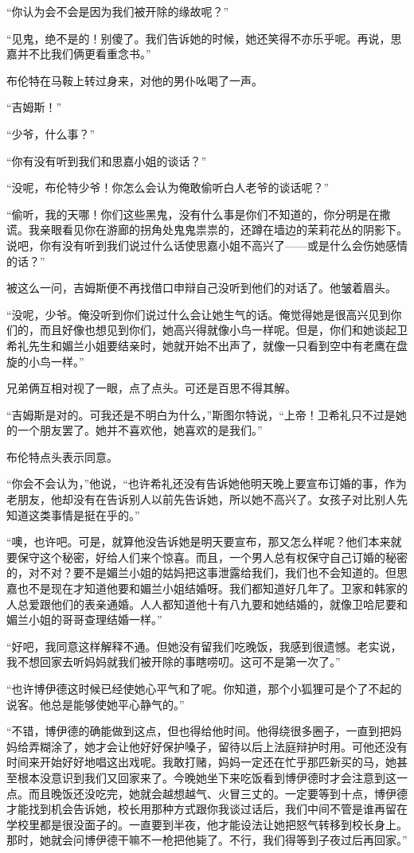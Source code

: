 \par “你认为会不会是因为我们被开除的缘故呢？”
\par “见鬼，绝不是的！别傻了。我们告诉她的时候，她还笑得不亦乐乎呢。再说，思嘉并不比我们俩更看重念书。”
\par 布伦特在马鞍上转过身来，对他的男仆吆喝了一声。
\par “吉姆斯！”
\par “少爷，什么事？”
\par “你有没有听到我们和思嘉小姐的谈话？”
\par “没呢，布伦特少爷！你怎么会认为俺敢偷听白人老爷的谈话呢？”
\par “偷听，我的天哪！你们这些黑鬼，没有什么事是你们不知道的，你分明是在撒谎。我亲眼看见你在游廊的拐角处鬼鬼祟祟的，还蹲在墙边的茉莉花丛的阴影下。说吧，你有没有听到我们说过什么话使思嘉小姐不高兴了——或是什么会伤她感情的话？”
\par 被这么一问，吉姆斯便不再找借口申辩自己没听到他们的对话了。他皱着眉头。
\par “没呢，少爷。俺没听到你们说过什么会让她生气的话。俺觉得她是很高兴见到你们的，而且好像也想见到你们，她高兴得就像小鸟一样呢。但是，你们和她谈起卫希礼先生和媚兰小姐要结亲时，她就开始不出声了，就像一只看到空中有老鹰在盘旋的小鸟一样。”
\par 兄弟俩互相对视了一眼，点了点头。可还是百思不得其解。
\par “吉姆斯是对的。可我还是不明白为什么，”斯图尔特说，“上帝！卫希礼只不过是她的一个朋友罢了。她并不喜欢他，她喜欢的是我们。”
\par 布伦特点头表示同意。
\par “你会不会认为，”他说，“也许希礼还没有告诉她他明天晚上要宣布订婚的事，作为老朋友，他却没有在告诉别人以前先告诉她，所以她不高兴了。女孩子对比别人先知道这类事情是挺在乎的。”
\par “噢，也许吧。可是，就算他没告诉她是明天要宣布，那又怎么样呢？他们本来就要保守这个秘密，好给人们来个惊喜。而且，一个男人总有权保守自己订婚的秘密的，对不对？要不是媚兰小姐的姑妈把这事泄露给我们，我们也不会知道的。但思嘉也不是现在才知道他要和媚兰小姐结婚呀。我们都知道好几年了。卫家和韩家的人总爱跟他们的表亲通婚。人人都知道他十有八九要和她结婚的，就像卫哈尼要和媚兰小姐的哥哥查理结婚一样。”
\par “好吧，我同意这样解释不通。但她没有留我们吃晚饭，我感到很遗憾。老实说，我不想回家去听妈妈就我们被开除的事瞎唠叨。这可不是第一次了。”
\par “也许博伊德这时候已经使她心平气和了呢。你知道，那个小狐狸可是个了不起的说客。他总是能够使她平心静气的。”
\par “不错，博伊德的确能做到这点，但也得给他时间。他得绕很多圈子，一直到把妈妈给弄糊涂了，她才会让他好好保护嗓子，留待以后上法庭辩护时用。可他还没有时间来开始好好地唱这出戏呢。我敢打赌，妈妈一定还在忙乎那匹新买的马，她甚至根本没意识到我们又回家来了。今晚她坐下来吃饭看到博伊德时才会注意到这一点。而且晚饭还没吃完，她就会越想越气、火冒三丈的。一定要等到十点，博伊德才能找到机会告诉她，校长用那种方式跟你我谈过话后，我们中间不管是谁再留在学校里都是很没面子的。一直要到半夜，他才能设法让她把怒气转移到校长身上。那时，她就会问博伊德干嘛不一枪把他毙了。不行，我们得等到子夜过后再回家。”
